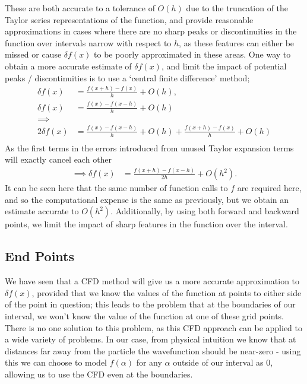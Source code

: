 These are both accurate to a tolerance of $O(h)$ due to the truncation of the Taylor series representations of the function, and provide reasonable approximations in cases where there are no sharp peaks or discontinuities in the function over intervals narrow with respect to $h$, as these features can either be missed or cause $\delta f(x)$ to be poorly approximated in these areas. One way to obtain a more accurate estimate of $\delta f(x)$, and limit the impact of potential peaks / discontinuities is to use a `central finite difference' method;
\begin{align*}
	\delta f\left(x\right) &= \frac{f\left(x + h\right) - f\left(x\right)}{h} + O(h),\\
	\delta f\left(x\right) &= \frac{f\left(x\right) - f\left(x - h\right)}{h} + O(h)\\
	\implies&\\
	2\delta f\left(x\right) &= \frac{f\left(x\right) - f\left(x - h\right)}{h} + O(h) + \frac{f\left(x + h\right) - f\left(x\right)}{h} + O(h)\\
\end{align*}
	As the first terms in the errors introduced from unused Taylor expansion terms will exactly cancel each other
\begin{align*}
	\implies \delta f\left(x\right) &= \frac{f\left(x + h\right) - f\left(x - h\right)}{2h} + O\left(h^{2}\right).
\end{align*}
It can be seen here that the same number of function calls to $f$ are required here, and so the computational expense is the same as previously, but we obtain an estimate accurate to $O(h^{2})$. Additionally, by using both forward and backward points, we limit the impact of sharp features in the function over the interval.

\subsection{End Points}
We have seen that a CFD method will give us a more accurate approximation to $\delta f(x)$, provided that we know the values of the function at points to either side of the point in question; this leads to the problem that at the boundaries of our interval, we won't know the value of the function at one of these grid points. There is no one solution to this problem, as this CFD approach can be applied to a wide variety of problems. In our case, from physical intuition we know that at distances far away from the particle the wavefunction should be near-zero - using this we can choose to model $f(\alpha)$ for any $\alpha$ outside of our interval as $0$, allowing us to use the CFD even at the boundaries.

